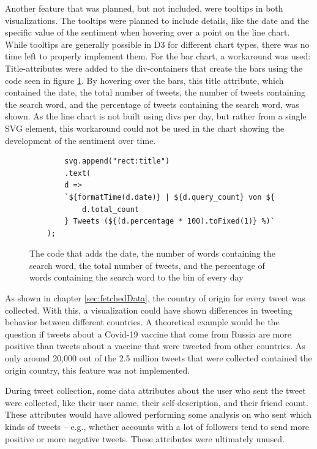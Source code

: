 Another feature that was planned, but not included, were tooltips in both visualizations. The tooltips were planned to include details, like the date and the specific value of the sentiment when hovering over a point on the line chart. While tooltips are generally possible in D3 for different chart types, there was no time left to properly implement them. For the bar chart, a workaround was used: Title-attributes were added to the div-containers that create the bars using the code seen in figure \ref{code:details_title}. By hovering over the bars, this title attribute, which contained the date, the total number of tweets, the number of tweets containing the search word, and the percentage of tweets containing the search word, was shown. As the line chart is not built using divs per day, but rather from a single SVG element, this workaround could not be used in the chart showing the development of the sentiment over time.

\begin{figure}[h!]
    \begin{verbatim}
        svg.append("rect:title")
        .text(
        d =>
        `${formatTime(d.date)} | ${d.query_count} von ${
            d.total_count
        } Tweets (${(d.percentage * 100).toFixed(1)} %)`
    );
    \end{verbatim}
    \caption{The code that adds the date, the number of words containing the search word, the total number of tweets, and the percentage of words containing the search word to the bin of every day}
    \label{code:details_title}
\end{figure}

As shown in chapter \ref{sec:fetchedData}, the country of origin for every tweet was collected. With this, a visualization could have shown differences in tweeting behavior between different countries. A theoretical example would be the question if tweets about a Covid-19 vaccine that come from Russia are more positive than tweets about a vaccine that were tweeted from other countries. As only around 20,000 out of the 2.5 million tweets that were collected contained the origin country, this feature was not implemented.

During tweet collection, some data attributes about the user who sent the tweet were collected, like their user name, their self-description, and their friend count. These attributes would have allowed performing some analysis on who sent which kinds of tweets – e.g., whether accounts with a lot of followers tend to send more positive or more negative tweets. These attributes were ultimately unused.

